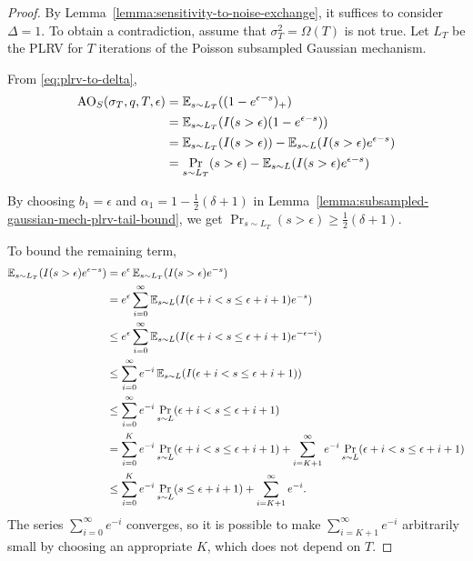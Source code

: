 \documentclass{article}
\theoremstyle{plain}
\theoremstyle{definition}
\theoremstyle{remark}
\begin{document}
\theoremsigmagrowth*
\begin{proof}
    By Lemma~\ref{lemma:sensitivity-to-noise-exchange}, it suffices to consider $\Delta = 1$.
    To obtain a contradiction, assume that $\sigma_T^2 = \Omega(T)$ is not true.
    Let $L_T$ be the PLRV for $T$ iterations of the Poisson subsampled Gaussian mechanism.

    From \eqref{eq:plrv-to-delta},
    \begin{equation}
        \begin{split}
            \mathrm{AO}_S(\sigma_T, q, T, \epsilon) 
            &= \operatorname{\mathbb{E}}_{s\sim L_T}((1 - e^{\epsilon - s})_+)
            \\&= \operatorname{\mathbb{E}}_{s\sim L_T}(I(s > \epsilon)(1 - e^{\epsilon - s}))
            \\&= \operatorname{\mathbb{E}}_{s\sim L_T}(I(s > \epsilon)) - \operatorname{\mathbb{E}}_{s\sim L}(I(s > \epsilon)e^{\epsilon - s})
            \\&= \Pr_{s\sim L_T}(s > \epsilon) - \operatorname{\mathbb{E}}_{s\sim L}(I(s > \epsilon)e^{\epsilon - s})
        \end{split}
    \end{equation}

    By choosing $b_1 = \epsilon$ and $\alpha_1 = 1 - \frac{1}{2}(\delta + 1)$ in 
    Lemma~\ref{lemma:subsampled-gaussian-mech-plrv-tail-bound}, we get
    $\Pr_{s\sim L_T}(s > \epsilon) \geq \frac{1}{2}(\delta + 1)$.

    To bound the remaining term,
    \begin{equation}
        \begin{split}
            \operatorname{\mathbb{E}}_{s\sim L_T}(I(s > \epsilon)e^{\epsilon - s})
            &= e^\epsilon \operatorname{\mathbb{E}}_{s\sim L_T}(I(s > \epsilon)e^{-s})
            \\&= e^\epsilon \sum_{i=0}^\infty\operatorname{\mathbb{E}}_{s\sim L}(I(\epsilon + i < s \leq \epsilon + i + 1)e^{-s})
            \\&\leq e^\epsilon \sum_{i=0}^\infty\operatorname{\mathbb{E}}_{s\sim L}(I(\epsilon + i < s \leq \epsilon + i + 1)e^{-\epsilon - i})
            \\&\leq \sum_{i=0}^\infty e^{-i} \operatorname{\mathbb{E}}_{s\sim L}(I(\epsilon + i < s \leq \epsilon + i + 1))
            \\&\leq \sum_{i=0}^\infty e^{-i} \Pr_{s\sim L}(\epsilon + i < s \leq \epsilon + i + 1)
            \\&= \sum_{i=0}^K e^{-i} \Pr_{s\sim L}(\epsilon + i < s \leq \epsilon + i + 1)
            + \sum_{i=K+1}^\infty e^{-i} \Pr_{s\sim L}(\epsilon + i < s \leq \epsilon + i + 1)
            \\&\leq \sum_{i=0}^K e^{-i} \Pr_{s\sim L}(s \leq \epsilon + i + 1)
            + \sum_{i=K+1}^\infty e^{-i}.
        \end{split}
    \end{equation}
    The series $\sum_{i=0}^\infty e^{-i}$ converges, so it is possible to make $\sum_{i=K+1}^\infty e^{-i}$ arbitrarily 
    small by choosing an appropriate $K$, which does not depend on $T$.


\end{proof}
\end{document}
